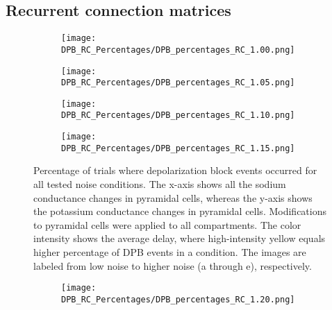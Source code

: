 \subsection{Recurrent connection matrices}\label{subsec:recurrent_connection_matrices}
\begin{figure}[H]
    \centering
    \begin{subfigure}{0.48\textwidth}
        \texttt{[image: DPB\_RC\_Percentages/DPB\_percentages\_RC\_1.00.png]}
        \caption{} %
    \end{subfigure}\hfill
    \begin{subfigure}{0.48\textwidth}
        \texttt{[image: DPB\_RC\_Percentages/DPB\_percentages\_RC\_1.05.png]}
        \caption{} %
    \end{subfigure}

    \bigskip %

    \begin{subfigure}{0.48\textwidth}
        \texttt{[image: DPB\_RC\_Percentages/DPB\_percentages\_RC\_1.10.png]}
        \caption{} %
    \end{subfigure}\hfill
    \begin{subfigure}{0.48\textwidth}
        \texttt{[image: DPB\_RC\_Percentages/DPB\_percentages\_RC\_1.15.png]}
        \caption{} %
    \end{subfigure}

    \caption[RC DPB percentage matrices (all)]{Percentage of trials where depolarization block events occurred for all tested noise conditions.
        The x-axis shows all the sodium conductance changes in pyramidal cells, whereas the y-axis shows the potassium conductance changes in pyramidal cells.
        Modifications to pyramidal cells were applied to all compartments.
        The color intensity shows the average delay, where high-intensity yellow equals higher percentage of DPB events in a condition.
        The images are labeled from low noise to higher noise (a through e), respectively.}\label{fig:rc_dpb_percentage_matrices_all}
\end{figure}

\begin{figure}[H] \ContinuedFloat%
    \centering
    \begin{subfigure}{0.48\textwidth}
        \texttt{[image: DPB\_RC\_Percentages/DPB\_percentages\_RC\_1.20.png]}
        \caption{} %
    \end{subfigure}\hfill
\end{figure}
